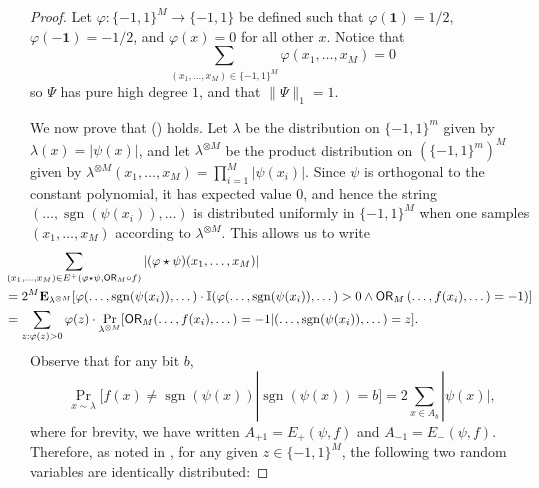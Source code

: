 \documentclass[11pt, letterpaper, fleqn]{article}
\theoremstyle{plain}
\newcommand{\sgn}{\mathrm{sign}}
\newcommand{\OR}{\mathsf{ OR}}
\newcommand{\ls}{\star}
\renewcommand{\sgn}{\operatorname{sgn}}
\begin{document}
\begin{proof} 
Let $\varphi: \{-1, 1\}^M \rightarrow \{-1, 1\}$ be defined such that $\varphi(\mathbf{1})=1/2$, $\varphi(-\mathbf{1})=-1/2$, and $\varphi(x)=0$ for all other $x$. 
Notice that 
\begin{equation}  \sum_{(x_1, \dots, x_{M}) \in \{-1, 1\}^M} \varphi(x_1, \dots, x_{M}) = 0 \label{eq:balanced} \end{equation}
so $\Psi$ has pure high degree $1$, and that $\|\Psi\|_1 = 1$. 


We now prove that () holds. Let $\lambda$ be the distribution on $\{-1, 1\}^{m}$ given by $\lambda(x) = |\psi(x)|$, and let $\lambda^{\otimes M}$ be the product distribution on $(\{-1, 1\}^m)^M$ given by $\lambda^{\otimes M}(x_1, \dots, x_M) = \prod_{i=1}^M |\psi(x_i)|$.
Since $\psi$ is orthogonal to the constant polynomial, it has expected value 0, and hence the string $(\dots, \sgn(\psi(x_i)), \dots)$ is distributed uniformly in $\{-1, 1\}^{M}$
when one samples $(x_1, \dots, x_{M})$ according to $\lambda^{\otimes M}$. This allows us to write
\begin{align}
&\hspace{-2em}\sum_{(x_1, \dots, x_{M}) \in E^+(\varphi \ls \psi, \OR_M \circ f)} |(\varphi \ls \psi)(x_1, \dots, x_M)| \nonumber \\
&\hspace{-2em}= 2^{M} \mathbf{E}_{\lambda^{\otimes M}} [\varphi( \dots, \sgn(\psi(x_i)), \dots) \cdot \mathbb{I} (\varphi( \dots, \sgn(\psi(x_i)), \dots) > 0 \land \OR_M\left( \dots, f(x_i), \dots\right) = -1)] \nonumber\\
&\hspace{-2em}= \sum_{z : \varphi(z) > 0} \varphi(z) \cdot \Pr_{\lambda^{\otimes M}} [\OR_M(\dots, f(x_i), \dots) = -1 | (\dots, \sgn(\psi(x_i)), \dots) = z]. \label{eqn:error-amp-middle}
\end{align}
Observe that for any bit $b$,
\[\Pr_{x \sim \lambda} [f(x) \ne \sgn(\psi(x)) | \sgn(\psi(x)) = b] = 2\sum_{x \in A_b} |\psi(x)|,\]
where for brevity, we have written $A_{+1} = E_+(\psi, f)$ and $A_{-1} = E_-(\psi, f)$. Therefore, as noted in \cite{sherstovhalfspaces1}, for any given $z \in \{-1, 1\}^{M}$, the following two random variables are identically distributed:


\end{proof}
\end{document}
